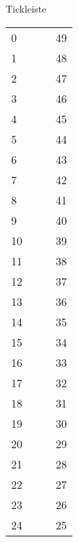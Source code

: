 \documentclass[a4paper, 11pt]{article}
\begin{document}
\sffamily
{}
\center
\begin{spmbox}{Tickleiste}
\huge
\begin{tabularx}{\textwidth}{lX | Xr}
0 & & & 49 \\
1 & & & 48 \\
2 & & & 47 \\
3 & & & 46 \\
4 & & & 45 \\
5 & & & 44 \\
6 & & & 43 \\
7 & & & 42 \\
8 & & & 41 \\
9 & & & 40 \\
10 & & & 39 \\
11 & & & 38 \\
12 & & & 37 \\
13 & & & 36 \\
14 & & & 35 \\
15 & & & 34 \\
16 & & & 33 \\
17 & & & 32 \\
18 & & & 31 \\
19 & & & 30 \\
20 & & & 29 \\
21 & & & 28 \\
22 & & & 27 \\
23 & & & 26 \\
24 & & & 25
\end{tabularx}
\end{spmbox}
\end{document}
